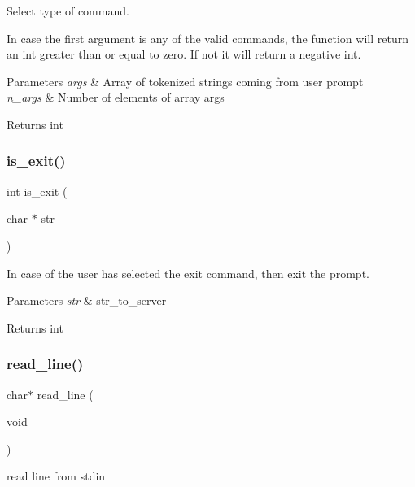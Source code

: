 Select type of command. 

In case the first argument is any of the valid commands, the function will return an int greater than or equal to zero. If not it will return a negative int. 
\begin{DoxyParams}{Parameters}
{\em args} & Array of tokenized strings coming from user prompt \\
\hline
{\em n\+\_\+args} & Number of elements of array args \\
\hline
\end{DoxyParams}
\begin{DoxyReturn}{Returns}
int 
\end{DoxyReturn}
\mbox{\label{prompt_8c_a9882fc592454588fc3587f2ec03e09ab}} 
\subsubsection{is\+\_\+exit()}
{\footnotesize\ttfamily int is\+\_\+exit (\begin{DoxyParamCaption}\item[{char $\ast$}]{str }\end{DoxyParamCaption})}



In case of the user has selected the exit command, then exit the prompt. 


\begin{DoxyParams}{Parameters}
{\em str} & str\+\_\+to\+\_\+server \\
\hline
\end{DoxyParams}
\begin{DoxyReturn}{Returns}
int 
\end{DoxyReturn}
\mbox{\label{prompt_8c_ac14a4d3d27ec36419b82f72342be3a65}} 
\subsubsection{read\+\_\+line()}
{\footnotesize\ttfamily char$\ast$ read\+\_\+line (\begin{DoxyParamCaption}\item[{void}]{ }\end{DoxyParamCaption})}



read line from stdin 

